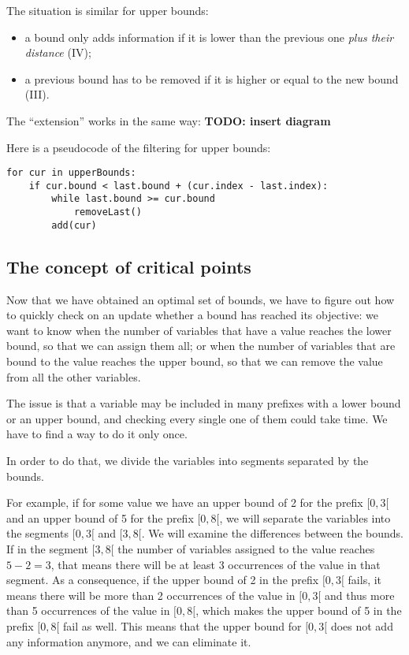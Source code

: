 \documentclass[a4paper,10pt]{article}
\begin{document}
The situation is similar for upper bounds:
\begin{itemize}
    \item a bound only adds information if it is lower than the previous one \emph{plus their distance} (IV);
    \item a previous bound has to be removed if it is higher or equal to the new bound (III).
\end{itemize}

The ``extension'' works in the same way: \textbf{TODO: insert diagram}

Here is a pseudocode of the filtering for upper bounds:
\begin{lstlisting}
for cur in upperBounds:
    if cur.bound < last.bound + (cur.index - last.index):
        while last.bound >= cur.bound
            removeLast()
        add(cur)
\end{lstlisting}

\subsection{The concept of critical points}
\label{subsec:critical}

Now that we have obtained an optimal set of bounds, we have to figure out how to quickly check on an update whether a bound has reached its objective: we want to know when the number of variables that have a value reaches the lower bound, so that we can assign them all; or when the number of variables that are bound to the value reaches the upper bound, so that we can remove the value from all the other variables.

The issue is that a variable may be included in many prefixes with a lower bound or an upper bound, and checking every single one of them could take time. We have to find a way to do it only once.

In order to do that, we divide the variables into segments separated by the bounds.

For example, if for some value we have an upper bound of 2 for the prefix $[0,3[$ and an upper bound of 5 for the prefix $[0,8[$, we will separate the variables into the segments $[0,3[$ and $[3,8[$. We will examine the differences between the bounds. If in the segment $[3,8[$ the number of variables assigned to the value reaches $5-2=3$, that means there will be at least 3 occurrences of the value in that segment. As a consequence, if the upper bound of 2 in the prefix $[0,3[$ fails, it means there will be more than 2 occurrences of the value in $[0,3[$ and thus more than 5 occurrences of the value in $[0,8[$, which makes the upper bound of 5 in the prefix $[0,8[$ fail as well. This means that the upper bound for $[0,3[$ does not add any information anymore, and we can eliminate it.
\end{document}

